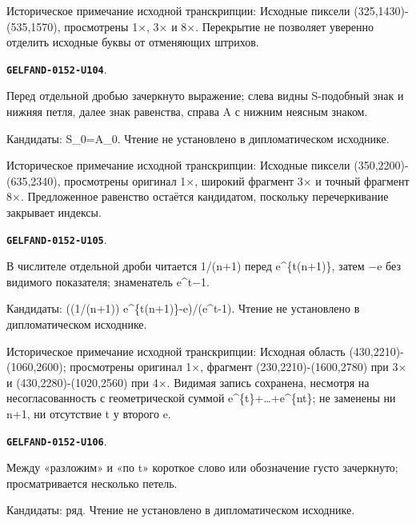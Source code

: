 \documentclass[11pt]{article}
\theoremstyle{definition}
\theoremstyle{remark}
\begin{document}
Историческое примечание исходной транскрипции: Исходные пиксели (325,1430)-(535,1570), просмотрены 1×, 3× и 8×. Перекрытие не позволяет уверенно отделить исходные буквы от отменяющих штрихов.\par\medskip
\par\noindent\leavevmode{}\label{GELFAND-0152-U104}\label{GELFAND-P001395:exponential-cancellation:note}\textbf{\texttt{GELFAND-0152-U104}}.\nopagebreak[4]\par
Перед отдельной дробью зачеркнуто выражение; слева видны S-подобный знак и нижняя петля, далее знак равенства, справа A с нижним неясным знаком.\par
Кандидаты: S\_0=A\_0. Чтение не установлено в дипломатическом исходнике.\par
Историческое примечание исходной транскрипции: Исходные пиксели (350,2200)-(635,2340), просмотрены оригинал 1×, широкий фрагмент 3× и точный фрагмент 8×. Предложенное равенство остаётся кандидатом, поскольку перечеркивание закрывает индексы.\par\medskip
\par\noindent\leavevmode{}\label{GELFAND-0152-U105}\label{GELFAND-P001395:exponential-fraction:note}\textbf{\texttt{GELFAND-0152-U105}}.\nopagebreak[4]\par
В числителе отдельной дроби читается 1/(n+1) перед e\textasciicircum{}\{t(n+1)\}, затем −e без видимого показателя; знаменатель e\textasciicircum{}t−1.\par
Кандидаты: ((1/(n+1)) e\textasciicircum{}\{t(n+1)\}-e)/(e\textasciicircum{}t-1). Чтение не установлено в дипломатическом исходнике.\par
Историческое примечание исходной транскрипции: Исходная область (430,2210)-(1060,2600); просмотрены оригинал 1×, фрагмент (230,2210)-(1600,2780) при 3× и (430,2280)-(1020,2560) при 4×. Видимая запись сохранена, несмотря на несогласованность с геометрической суммой e\textasciicircum{}\{t\}+…+e\textasciicircum{}\{nt\}; не заменены ни n+1, ни отсутствие t у второго e.\par\medskip
\par\noindent\leavevmode{}\label{GELFAND-0152-U106}\label{GELFAND-P001395:series-cancellation:note}\textbf{\texttt{GELFAND-0152-U106}}.\nopagebreak[4]\par
Между «разложим» и «по t» короткое слово или обозначение густо зачеркнуто; просматривается несколько петель.\par
Кандидаты: ряд. Чтение не установлено в дипломатическом исходнике.\par
\end{document}
